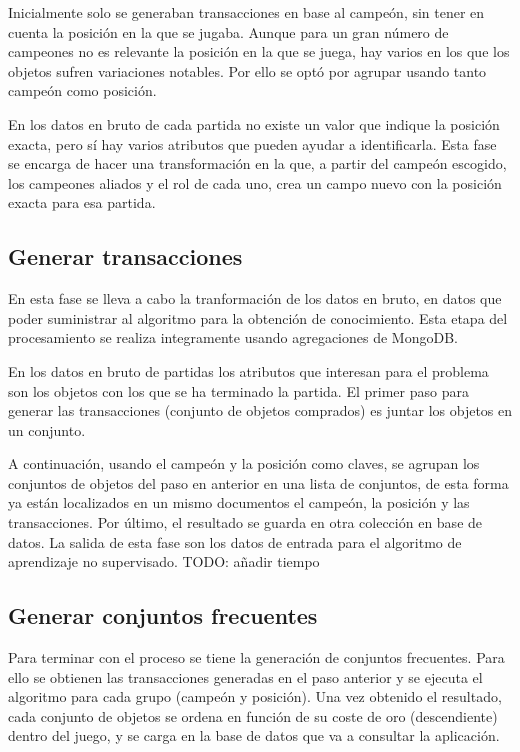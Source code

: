 Inicialmente solo se generaban transacciones en base al campeón, sin tener en cuenta la posición en la que se jugaba. Aunque para un gran número de campeones no es relevante la posición en la que se juega, hay varios en los que los objetos sufren variaciones notables. Por ello se optó por agrupar usando tanto campeón como posición.

En los datos en bruto de cada partida no existe un valor que indique la posición exacta, pero sí hay varios atributos que pueden ayudar a identificarla. Esta fase se encarga de hacer una transformación en la que, a partir del campeón escogido, los campeones aliados y el rol de cada uno, crea un campo nuevo con la posición exacta para esa partida.

\subsection{Generar transacciones}
En esta fase se lleva a cabo la tranformación de los datos en bruto, en datos que poder suministrar al algoritmo para la obtención de conocimiento. Esta etapa del procesamiento se realiza integramente usando agregaciones de MongoDB.

En los datos en bruto de partidas los atributos que interesan para el problema son los objetos con los que se ha terminado la partida. El primer paso para generar las transacciones (conjunto de objetos comprados) es juntar los objetos en un conjunto.

A continuación, usando el campeón y la posición como claves, se agrupan los conjuntos de objetos del paso en anterior en una lista de conjuntos, de esta forma ya están localizados en un mismo documentos el campeón, la posición y las transacciones. Por último, el resultado se guarda en otra colección en base de datos. La salida de esta fase son los datos de entrada para el algoritmo de aprendizaje no supervisado.
TODO: añadir tiempo

\subsection{Generar conjuntos frecuentes}
Para terminar con el proceso se tiene la generación de conjuntos frecuentes. Para ello se obtienen las transacciones generadas en el paso anterior y se ejecuta el algoritmo para cada grupo (campeón y posición). Una vez obtenido el resultado, cada conjunto de objetos se ordena en función de su coste de oro (descendiente) dentro del juego, y se carga en la base de datos que va a consultar la aplicación.

